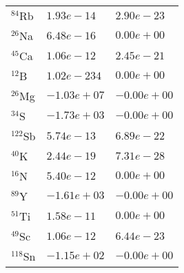 \begin{tabular}{lll}
 $^{84}$Rb  & $1.93e-14 $                                                        & $2.90e-23 $                                                                     \\
 $^{26}$Na  & $6.48e-16 $                                                        & $0.00e+00 $                                                                     \\
 $^{45}$Ca  & $1.06e-12 $                                                        & $2.45e-21 $                                                                     \\
 $^{12}$B   & $1.02e-234 $                                                       & $0.00e+00 $                                                                     \\
 $^{26}$Mg  & $-1.03e+07 $                                                       & $-0.00e+00 $                                                                    \\
 $^{34}$S   & $-1.73e+03 $                                                       & $-0.00e+00 $                                                                    \\
 $^{122}$Sb & $5.74e-13 $                                                        & $6.89e-22 $                                                                     \\
 $^{40}$K   & $2.44e-19 $                                                        & $7.31e-28 $                                                                     \\
 $^{16}$N   & $5.40e-12 $                                                        & $0.00e+00 $                                                                     \\
 $^{89}$Y   & $-1.61e+03 $                                                       & $-0.00e+00 $                                                                    \\
 $^{51}$Ti  & $1.58e-11 $                                                        & $0.00e+00 $                                                                     \\
 $^{49}$Sc  & $1.06e-12 $                                                        & $6.44e-23 $                                                                     \\
 $^{118}$Sn & $-1.15e+02 $                                                       & $-0.00e+00 $                                                                    \\

\end{tabular}
